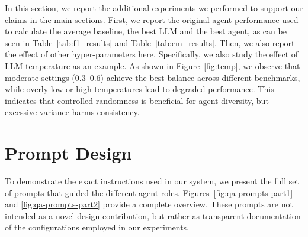 \documentclass[11pt]{article}
\begin{document}
In this section, we report the additional experiments we performed to support our claims in the main sections. First, we report the original agent performance used to calculate the average baseline, the best LLM and the best agent, as can be seen in Table~\ref{tab:f1_results} and Table~\ref{tab:em_results}. Then, we also report the effect of other hyper-parameters here. Specifically, we also study the effect of LLM temperature as an example. As shown in Figure~\ref{fig:temp}, we observe that moderate settings ($0.3$--$0.6$) achieve the best balance across different benchmarks, while overly low or high temperatures lead to degraded performance. This indicates that controlled randomness is beneficial for agent diversity, but excessive variance harms consistency.

\section{Prompt Design}

To demonstrate the exact instructions used in our system, we present the full set of prompts that guided the different agent roles. Figures~\ref{fig:qa-prompts-part1} and \ref{fig:qa-prompts-part2} provide a complete overview. These prompts are not intended as a novel design contribution, but rather as transparent documentation of the configurations employed in our experiments.
\end{document}
